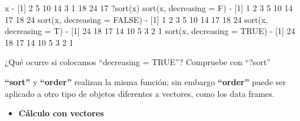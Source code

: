 \documentclass[
]{book}
\newenvironment{Shaded}{\begin{snugshade}}{\end{snugshade}}
\newcommand{\AttributeTok}[1]{\textcolor[rgb]{0.77,0.63,0.00}{#1}}
\newcommand{\ConstantTok}[1]{\textcolor[rgb]{0.00,0.00,0.00}{#1}}
\newcommand{\DecValTok}[1]{\textcolor[rgb]{0.00,0.00,0.81}{#1}}
\newcommand{\FunctionTok}[1]{\textcolor[rgb]{0.00,0.00,0.00}{#1}}
\newcommand{\NormalTok}[1]{#1}
\newcommand{\SpecialCharTok}[1]{\textcolor[rgb]{0.00,0.00,0.00}{#1}}
\providecommand{\tightlist}{%
  \setlength{\itemsep}{0pt}\setlength{\parskip}{0pt}}
\begin{document}
\begin{Shaded}
\begin{Highlighting}[]
\NormalTok{x}
\SpecialCharTok{{-}}\NormalTok{ [}\DecValTok{1}\NormalTok{]  }\DecValTok{2}  \DecValTok{5} \DecValTok{10} \DecValTok{14}  \DecValTok{3}  \DecValTok{1} \DecValTok{18} \DecValTok{24} \DecValTok{17}
\NormalTok{?}\FunctionTok{sort}\NormalTok{(x)}
\FunctionTok{sort}\NormalTok{(x, }\AttributeTok{decreasing =}\NormalTok{ F)}
\SpecialCharTok{{-}}\NormalTok{ [}\DecValTok{1}\NormalTok{]  }\DecValTok{1}  \DecValTok{2}  \DecValTok{3}  \DecValTok{5} \DecValTok{10} \DecValTok{14} \DecValTok{17} \DecValTok{18} \DecValTok{24}
\FunctionTok{sort}\NormalTok{(x, }\AttributeTok{decreasing =} \ConstantTok{FALSE}\NormalTok{)}
\SpecialCharTok{{-}}\NormalTok{ [}\DecValTok{1}\NormalTok{]  }\DecValTok{1}  \DecValTok{2}  \DecValTok{3}  \DecValTok{5} \DecValTok{10} \DecValTok{14} \DecValTok{17} \DecValTok{18} \DecValTok{24}
\FunctionTok{sort}\NormalTok{(x, }\AttributeTok{decreasing =}\NormalTok{ T)}
\SpecialCharTok{{-}}\NormalTok{ [}\DecValTok{1}\NormalTok{] }\DecValTok{24} \DecValTok{18} \DecValTok{17} \DecValTok{14} \DecValTok{10}  \DecValTok{5}  \DecValTok{3}  \DecValTok{2}  \DecValTok{1}
\FunctionTok{sort}\NormalTok{(x, }\AttributeTok{decreasing =} \ConstantTok{TRUE}\NormalTok{)}
\SpecialCharTok{{-}}\NormalTok{ [}\DecValTok{1}\NormalTok{] }\DecValTok{24} \DecValTok{18} \DecValTok{17} \DecValTok{14} \DecValTok{10}  \DecValTok{5}  \DecValTok{3}  \DecValTok{2}  \DecValTok{1}
\end{Highlighting}
\end{Shaded}

¿Qué ocurre si colocamos ``decreasing = TRUE''? Compruebe con ``?sort''

\textbf{``sort''} y \textbf{``order''} realizan la misma función; sin embargo \textbf{``order''} puede ser aplicado a otro tipo de objetos diferentes a vectores, como los data frames.

\begin{itemize}
\tightlist
\item
  \textbf{Cálculo con vectores}
\end{itemize}
\end{document}
